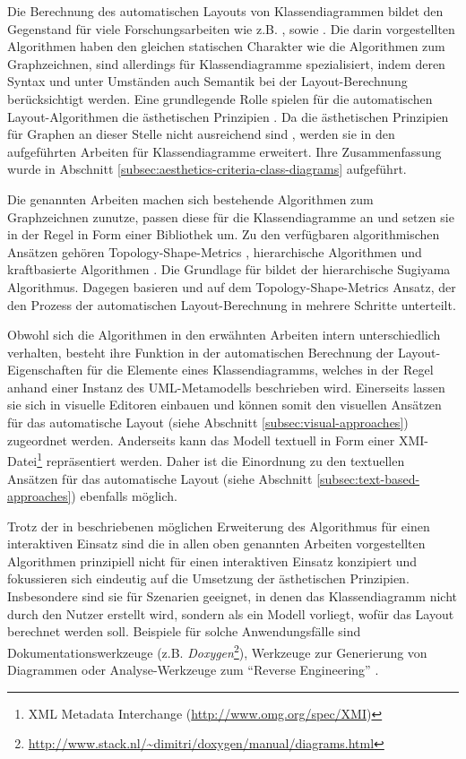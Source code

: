 Die Berechnung des automatischen Layouts von Klassendiagrammen bildet den Gegenstand für viele Forschungsarbeiten wie z.B. \cite{Eichelberger05Aesthetics}, \cite{Siebenhaller03Automatisches} sowie \cite{Eiglsperger04Automatic}. Die darin vorgestellten Algorithmen haben den gleichen statischen Charakter wie die Algorithmen zum Graphzeichnen, sind allerdings für Klassendiagramme spezialisiert, indem deren Syntax und unter Umständen auch Semantik bei der Layout-Berechnung berücksichtigt werden. Eine grundlegende Rolle spielen für die automatischen Layout-Algorithmen die ästhetischen Prinzipien \cite{Maier12A-Pattern-based}. Da die ästhetischen Prinzipien für Graphen an dieser Stelle nicht ausreichend sind \cite[S.79]{Eichelberger05Aesthetics}, werden sie in den aufgeführten Arbeiten für Klassendiagramme erweitert. Ihre Zusammenfassung wurde in Abschnitt \ref{subsec:aesthetics-criteria-class-diagrams} aufgeführt.

Die genannten Arbeiten machen sich bestehende Algorithmen zum Graphzeichnen zunutze, passen diese für die Klassendiagramme an und setzen sie in der Regel in Form einer Bibliothek um. Zu den verfügbaren algorithmischen Ansätzen gehören Topology-Shape-Metrics \cite[S.33]{Siebenhaller03Automatisches}, hierarchische Algorithmen und kraftbasierte Algorithmen \cite[S.32ff]{Eichelberger05Aesthetics}. Die Grundlage für \cite{Eichelberger05Aesthetics} bildet der hierarchische Sugiyama Algorithmus. Dagegen basieren \cite{Siebenhaller03Automatisches} und \cite{Eiglsperger04Automatic} auf dem Topology-Shape-Metrics Ansatz, der den Prozess der automatischen Layout-Berechnung in mehrere Schritte unterteilt.

Obwohl sich die Algorithmen in den erwähnten Arbeiten intern unterschiedlich verhalten, besteht ihre Funktion in der automatischen Berechnung der Layout-Eigenschaften für die Elemente eines Klassendiagramms, welches in der Regel anhand einer Instanz des UML-Metamodells beschrieben wird. Einerseits lassen sie sich in visuelle Editoren einbauen und können somit den visuellen Ansätzen für das automatische Layout (siehe Abschnitt \ref{subsec:visual-approaches}) zugeordnet werden. Anderseits kann das Modell textuell in Form einer XMI-Datei\footnote{XML Metadata Interchange (\url{http://www.omg.org/spec/XMI})} repräsentiert werden. Daher ist die Einordnung zu den textuellen Ansätzen für das automatische Layout (siehe Abschnitt \ref{subsec:text-based-approaches}) ebenfalls möglich.

Trotz der in \cite{Eiglsperger04Automatic} beschriebenen möglichen Erweiterung des Algorithmus für einen interaktiven Einsatz sind die in allen oben genannten Arbeiten vorgestellten Algorithmen prinzipiell nicht für einen interaktiven Einsatz konzipiert und fokussieren sich eindeutig auf die Umsetzung der ästhetischen Prinzipien. Insbesondere sind sie für Szenarien geeignet, in denen das Klassendiagramm nicht durch den Nutzer erstellt wird, sondern als ein Modell vorliegt, wofür das Layout berechnet werden soll. Beispiele für solche Anwendungsfälle sind Dokumentationswerkzeuge (z.B. \textit{Doxygen}\footnote{\url{http://www.stack.nl/~dimitri/doxygen/manual/diagrams.html}}), Werkzeuge zur Generierung von Diagrammen oder Analyse-Werkzeuge zum \enquote{Reverse Engineering} \cite{Eiglsperger04Automatic}.

